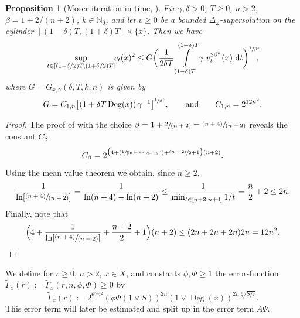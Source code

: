 \documentclass[10pt]{amsart}
\newcommand{\Psfrac}[2]{(\sfrac{#1}{#2})}
\newcommand{\psfrac}[2]{\sfrac{(#1)}{#2}}
\newcommand{\spfrac}[2]{\sfrac{#1}{(#2)}}
\newcommand{\pspfrac}[2]{\sfrac{(#1)}{(#2)}}
\theoremstyle{plain}
\newtheorem{proposition}[theorem]{Proposition}
\theoremstyle{definition}
\newcommand{\NN}{\mathbb{N}}
\newcommand{\drm}{\mathrm{d}}
\DeclareMathOperator{\Deg}{Deg}
\let\oldint\int
\renewcommand{\int}{\oldint\limits}
\begin{document}
\begin{proposition}[Moser iteration in time, ]\label{thm:constantballsdavies}
Fix $\gamma,\delta>0$, $T\geq 0$, $n>2$, $\beta=1+2/(n+2)$, $k\in\NN_0$, and let $v\geq 0$ be a bounded $\Delta_\omega$-supersolution on the cylinder $[(1-\delta)T,(1+\delta)T]\times \{x\}$.
Then we have
\begin{align*}
\sup_{t\in[(1-\delta/2)T,(1+\delta/2)T]}\!\! v_t(x)^2 \leq G \biggl(\frac{1}{2\delta T}\int\limits_{(1-\delta)T}^{(1+\delta)T}
\gamma\ v_t^{2\beta^k}(x)\ \drm t\biggr)^{\sfrac{1}{\beta^k}}\!\!\!,
\end{align*}
where $G=G_{x,\gamma}(\delta,T,k,n)$ is given by
\[
G= C_{1,n}
\bigl[\left(1+\delta T\Deg(x)\right)
\gamma^{-1}\bigr]^{\sfrac{1}{\beta^{k}}},
\qquad\text{and}\qquad
C_{1,n}=2^{{12} n^2}.
\]
\end{proposition}
\begin{proof}
The proof of \cite[Th.\,3.4]{KellerRose-22a} with the choice $\beta=1+\spfrac2{n+2}=\pspfrac{n+4}{n+2}$ reveals the constant $ C_{\beta} $
\[
C_{\beta}=2^{\bigl(4+\Psfrac{1}{[\ln\pspfrac{n+4}{n+2}]}+\psfrac{n+2}{2}+1\bigr)(n+2)}.
\]
Using the mean value theorem we obtain, since $n\geq 2$,
\[
\frac{1}{\ln[\pspfrac{n+4}{n+2}]}=\frac{1}{\ln(n+4)-\ln(n+2)}\leq \frac{1}{\min_{t\in[n+2,n+4]}1/t}= {\frac{n}{2}+2}\leq {2}n.
\]
Finally, note that
\[
\Bigl(4+\frac{1}{\ln[\pspfrac{n+4}{n+2}]}+\frac{n+2}{2}+1\Bigr)(n+2)
\leq (2n+ {2}n+2n)2n = {12}n^2.\qedhere
\]
\end{proof}

We define for $r\geq0$, $n>2$, $x\in X$, and constants $\phi,\Phi\geq 1$ the error-function $\tilde\Gamma_x(r)
:=
\tilde\Gamma_x(r,n,\phi,\Phi)\geq 0$ by
\[
\tilde\Gamma_x(r)
:=
2^{67n^2}(\phi \Phi(1\vee S))^{2n}
\left(1\vee\Deg(x)
\right)
^{2n\sqrt[n]{{S}/{r}}}.
\]
This error term will later be estimated and split up in the error term $ A\Psi $.
\end{document}
